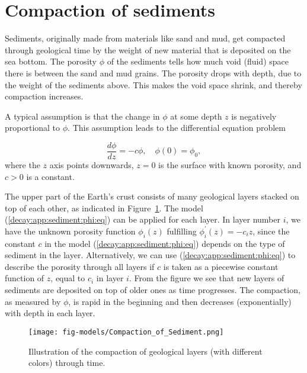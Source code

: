 \documentclass[graybox,sectrefs,envcountresetchap,open=right,final]{svmonodo}
\begin{document}
\section{Compaction of sediments}
\label{decay:app:sediment}

Sediments, originally made from materials like sand and mud, get
compacted through geological time by the weight of new material that
is deposited on the sea bottom. The porosity $\phi$ of the sediments
tells how much void (fluid) space there is between the sand and
mud grains. The porosity drops with depth, due to the weight of
the sediments above. This makes the void space shrink, and thereby compaction
increases.

A typical assumption is that the change in $\phi$ at some depth $z$
is negatively proportional to $\phi$. This assumption leads to
the differential equation problem

\begin{equation}
\frac{d\phi}{dz} = -c\phi,\quad \phi(0)=\phi_0,
\label{decay:app:sediment:phi:eq}
\end{equation}
where the $z$ axis points downwards, $z=0$ is the surface with known
porosity, and $c>0$ is a constant.

The upper part of the Earth's crust consists of many geological layers
stacked on top of each other, as indicated in Figure~\ref{decay:app:sediment:fig:layers}.  The model
(\ref{decay:app:sediment:phi:eq}) can be applied for each layer. In
layer number $i$, we have the unknown porosity function $\phi_i(z)$
fulfilling $\phi_i^{\prime}(z)=-c_iz$, since the constant $c$ in the model
(\ref{decay:app:sediment:phi:eq}) depends on the type of sediment in
the layer. Alternatively, we can use (\ref{decay:app:sediment:phi:eq})
to describe the porosity through all layers if $c$ is taken as a
piecewise constant function of $z$, equal to $c_i$ in layer $i$.
From the figure we see that new layers of sediments are
deposited on top of older ones as time progresses. The compaction,
as measured by $\phi$, is
rapid in the beginning and then decreases (exponentially) with depth
in each layer.


\begin{figure}[!ht]  %
  \centerline{\texttt{[image: fig-models/Compaction\_of\_Sediment.png]}}
  \caption{
  Illustration of the compaction of geological layers (with different colors) through time. \label{decay:app:sediment:fig:layers}
  }
\end{figure}
\end{document}
